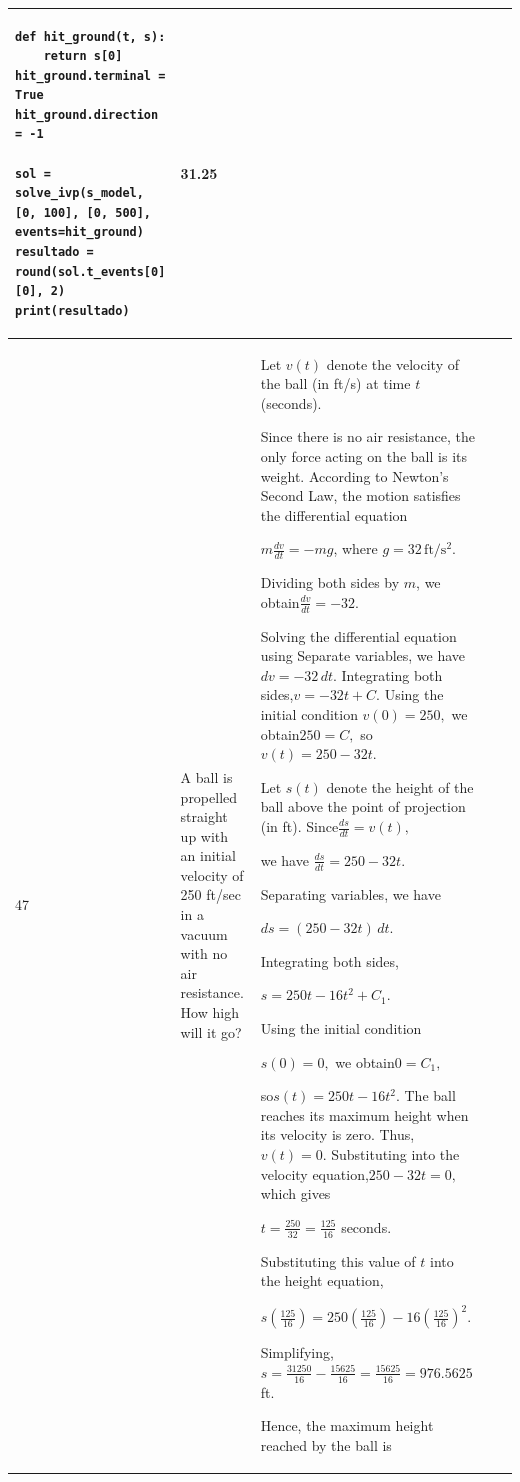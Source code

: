 \documentclass[a4paper,12pt]{article}
\begin{document}
\begin{longtable}{|p{0.3cm}|p{}|p{10cm}|p{}|p{1.5cm}|}
\begin{verbatim}
def hit_ground(t, s):
    return s[0]
hit_ground.terminal = True
hit_ground.direction = -1

sol = solve_ivp(s_model, [0, 100], [0, 500], events=hit_ground)
resultado = round(sol.t_events[0][0], 2)
print(resultado)
\end{verbatim}&  31.25 \\ \hline 
 47            &A ball is propelled straight up with an initial velocity of 250 ft/sec in a vacuum with no air resistance. How high
will it go?


              & Let $v(t)$ denote the velocity of the ball (in ft/s) at time $t$ (seconds).

Since there is no air resistance, the only force acting on the ball is its weight. According to Newton's Second Law, the motion satisfies the differential equation

$m\frac{dv}{dt}=-mg$, where $g=32\,\mathrm{ft/s^2}$.

Dividing both sides by $m$, we obtain$\frac{dv}{dt}=-32.$

Solving the differential equation using Separate variables, we have$dv=-32\,dt.$
Integrating both sides,$v=-32t+C.$
Using the initial condition
$v(0)=250,$ we obtain$250=C,$ so$v(t)=250-32t.$

Let $s(t)$ denote the height of the ball above the point of projection (in ft). Since$\frac{ds}{dt}=v(t),$

we have $\frac{ds}{dt}=250-32t.$

Separating variables, we have

$ds=(250-32t)\,dt.$

Integrating both sides,

$s=250t-16t^2+C_1.$

Using the initial condition

$s(0)=0,$
we obtain$0=C_1,$

so$s(t)=250t-16t^2.$
The ball reaches its maximum height when its velocity is zero. Thus,
$v(t)=0.$
Substituting into the velocity equation,$250-32t=0,$which gives

$t=\frac{250}{32}=\frac{125}{16}$ seconds.

Substituting this value of $t$ into the height equation,

$s\!\left(\frac{125}{16}\right)
=250\left(\frac{125}{16}\right)
-16\left(\frac{125}{16}\right)^2.$

Simplifying,$
s=\frac{31250}{16}-\frac{15625}{16}
=\frac{15625}{16}=976.5625$ ft.

Hence, the maximum height reached by the ball is


\end{longtable}
\end{document}
